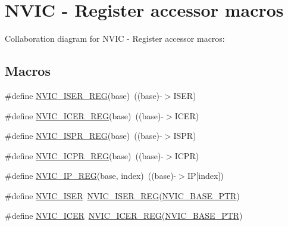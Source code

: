 \hypertarget{group___n_v_i_c___register___accessor___macros}{}\section{N\+V\+IC -\/ Register accessor macros}
\label{group___n_v_i_c___register___accessor___macros}
Collaboration diagram for N\+V\+IC -\/ Register accessor macros\+:
\subsection*{Macros}
\begin{DoxyCompactItemize}
\item 
\#define \hyperlink{group___n_v_i_c___register___accessor___macros_gabca9aa3e58e8d296e1ad7663dd9b45d4}{N\+V\+I\+C\+\_\+\+I\+S\+E\+R\+\_\+\+R\+EG}(base)~((base)-\/$>$I\+S\+ER)
\item 
\#define \hyperlink{group___n_v_i_c___register___accessor___macros_gae69fb9df9f1ea893a536d41054c8f035}{N\+V\+I\+C\+\_\+\+I\+C\+E\+R\+\_\+\+R\+EG}(base)~((base)-\/$>$I\+C\+ER)
\item 
\#define \hyperlink{group___n_v_i_c___register___accessor___macros_gafd5a3bbda3cf5a419a054c127f14d5e7}{N\+V\+I\+C\+\_\+\+I\+S\+P\+R\+\_\+\+R\+EG}(base)~((base)-\/$>$I\+S\+PR)
\item 
\#define \hyperlink{group___n_v_i_c___register___accessor___macros_ga22ff82de3e5a13c9cbb49bfd12e4f845}{N\+V\+I\+C\+\_\+\+I\+C\+P\+R\+\_\+\+R\+EG}(base)~((base)-\/$>$I\+C\+PR)
\item 
\#define \hyperlink{group___n_v_i_c___register___accessor___macros_gab650200327187b4594896adc6e6e1d53}{N\+V\+I\+C\+\_\+\+I\+P\+\_\+\+R\+EG}(base,  index)~((base)-\/$>$IP\mbox{[}index\mbox{]})
\item 
\#define \hyperlink{group___n_v_i_c___register___accessor___macros_ga92dfdc731185ed7507e681aa6f7d3f7e}{N\+V\+I\+C\+\_\+\+I\+S\+ER}~\hyperlink{group___n_v_i_c___register___accessor___macros_gabca9aa3e58e8d296e1ad7663dd9b45d4}{N\+V\+I\+C\+\_\+\+I\+S\+E\+R\+\_\+\+R\+EG}(\hyperlink{group___n_v_i_c___peripheral_ga28f0a055d0c218e16d1fc7b13ff0caa5}{N\+V\+I\+C\+\_\+\+B\+A\+S\+E\+\_\+\+P\+TR})
\item 
\#define \hyperlink{group___n_v_i_c___register___accessor___macros_gaac08461a730870d217b9b5780d3dbf87}{N\+V\+I\+C\+\_\+\+I\+C\+ER}~\hyperlink{group___n_v_i_c___register___accessor___macros_gae69fb9df9f1ea893a536d41054c8f035}{N\+V\+I\+C\+\_\+\+I\+C\+E\+R\+\_\+\+R\+EG}(\hyperlink{group___n_v_i_c___peripheral_ga28f0a055d0c218e16d1fc7b13ff0caa5}{N\+V\+I\+C\+\_\+\+B\+A\+S\+E\+\_\+\+P\+TR})

\end{DoxyCompactItemize}
